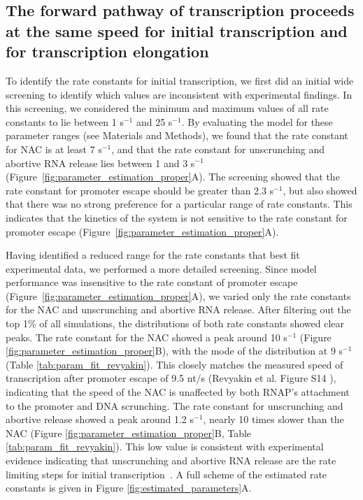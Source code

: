 %
\subsection{The forward pathway of transcription proceeds at the same speed
for initial transcription and for transcription elongation}

To identify the rate constants for initial transcription, we first did an
initial wide screening to identify which values are inconsistent with
experimental findings. In this screening, we considered the minimum and
maximum values of all rate constants to lie between 1 s$^{-1}$ and 25
s$^{-1}$. By evaluating the model for these parameter ranges (see Materials
and Methods), we found that the rate constant for NAC is at least 7 s$^{-1}$,
and that the rate constant for unscrunching and abortive RNA release lies
between 1 and 3 s$^{-1}$ (Figure~\ref{fig:parameter_estimation_proper}A). The
screening showed that the rate constant for promoter escape should be greater
than 2.3 s$^{-1}$, but also showed that there was no strong preference for a
particular range of rate constants. This indicates that the kinetics of the
system is not sensitive to the rate constant for promoter escape
(Figure~\ref{fig:parameter_estimation_proper}A).

Having identified a reduced range for the rate constants that best fit
experimental data, we performed a more detailed screening. Since model
performance was insensitive to the rate constant of promoter escape
(Figure~\ref{fig:parameter_estimation_proper}A), we varied only the rate
constants for the NAC and unscrunching and abortive RNA release. After
filtering out the top 1\% of all simulations, the distributions of both rate
constants showed clear peaks. The rate constant for the NAC showed a peak
around 10 s$^{-1}$ (Figure \ref{fig:parameter_estimation_proper}B), with the
mode of the distribution at 9 s$^{-1}$ (Table \ref{tab:param_fit_revyakin}).
This closely matches the measured speed of transcription after promoter escape
of 9.5 nt/s (Revyakin et al. Figure S14 \cite{revyakin_abortive_2006}),
indicating that the speed of the NAC is unaffected by both RNAP's attachment
to the promoter and DNA scrunching. The rate constant for unscrunching and
abortive release showed a peak around 1.2 s$^{-1}$, nearly 10 times slower
than the NAC (Figure \ref{fig:parameter_estimation_proper}B, Table
\ref{tab:param_fit_revyakin}). This low value is consistent with experimental
evidence indicating that unscrunching and abortive RNA release are the rate
limiting steps for initial transcription~\cite{margeat_direct_2006,
revyakin_abortive_2006}. A full scheme of the estimated rate constants is
given in Figure \ref{fig:estimated_parameters}A.


